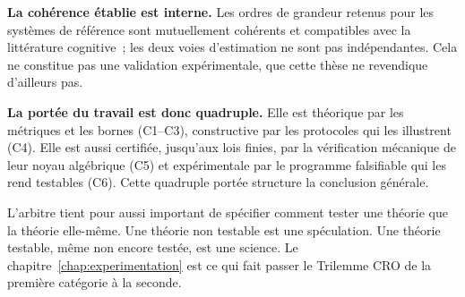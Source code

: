 \begin{sloppypar}
\textbf{La coh\'erence \'etablie est interne.} Les ordres
de grandeur retenus pour les syst\`emes de r\'ef\'erence sont mutuellement
coh\'erents et compatibles avec la litt\'erature cognitive~; les deux voies
d'estimation ne sont pas ind\'ependantes. Cela ne constitue pas une
validation exp\'erimentale, que cette th\`ese ne revendique d'ailleurs pas.

\textbf{La port\'ee du travail est donc quadruple.} Elle est
th\'eorique par les m\'etriques et les bornes (C1--C3),
constructive par les protocoles qui les illustrent (C4).
Elle est aussi certifi\'ee, jusqu'aux lois finies, par la v\'erification m\'ecanique de
leur noyau alg\'ebrique (C5) et
exp\'erimentale par le programme falsifiable qui les rend
testables (C6). Cette quadruple port\'ee structure la conclusion
g\'en\'erale.

\begin{boiteArbitre}
L'arbitre tient pour aussi important de sp\'ecifier comment tester une
th\'eorie que la th\'eorie elle-m\^eme. Une th\'eorie non testable
est une sp\'eculation. Une th\'eorie testable, m\^eme non encore
test\'ee, est une science. Le
chapitre~\ref{chap:experimentation} est ce qui fait passer le
Trilemme CRO de la premi\`ere cat\'egorie \`a la seconde.
\end{boiteArbitre}

\end{sloppypar}

